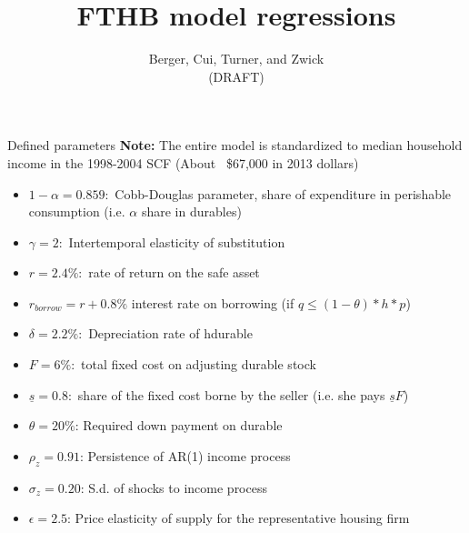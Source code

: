 \documentclass[9pt]{beamer}
\title{FTHB model regressions}
\author{Berger, Cui, Turner, and Zwick \\ (DRAFT)}
\begin{document}
\begin{frame}
\titlepage
\end{frame}

{
}

\begin{frame}{Defined parameters}
\textbf{Note:} The entire model is standardized to median household income
 in the 1998-2004 SCF (About ~\$67,000 in 2013 dollars)
\begin{itemize}
        \item $1-\alpha = 0.859:$ Cobb-Douglas parameter, share of expenditure
                in perishable consumption (i.e. $\alpha$ share in durables)
        \item $\gamma = 2:$ Intertemporal elasticity of substitution
        \item $r = 2.4\%:$ rate of return on the safe asset
        \item $r_{borrow} = r + 0.8\%$ interest rate on borrowing (if
                $q \leq (1-\theta)*h*p$)
        \item $\delta = 2.2\%:$ Depreciation rate of hdurable
        \item $F = 6\%:$ total fixed cost on adjusting durable stock
        \item $\underline{s} = 0.8:$ share of the fixed cost borne by the
                seller (i.e. she pays $\underline{s}F$)
        \item $\theta = 20\%$: Required down payment on durable
        \item $\rho_z = 0.91$: Persistence of AR(1) income process
        \item $\sigma_z = 0.20$: S.d. of shocks to income process
        \item $\epsilon = 2.5$: Price elasticity of supply for the representative
               housing firm
\end{itemize}
\end{frame}
\end{document}
